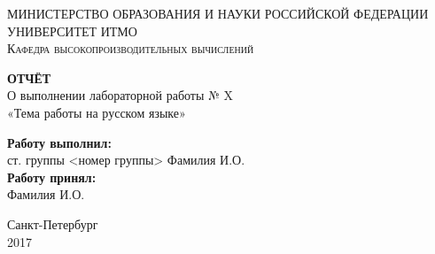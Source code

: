 \documentclass[12pt]{report}
\begin{document}
\def\contentsname{Содержание}

\begin{titlepage}

\begin{center}
\textsc{МИНИСТЕРСТВО ОБРАЗОВАНИЯ И НАУКИ РОССИЙСКОЙ ФЕДЕРАЦИИ\\
УНИВЕРСИТЕТ ИТМО\\
Кафедра высокопроизводительных вычислений
}

\vspace{6.68cm}

\textbf{\large ОТЧЁТ}\\[4.5mm]
О выполнении лабораторной работы № X\\
«Тема работы на русском языке»\\[18mm]
\end{center}
\hspace{\fill}
\begin{minipage}{.48\textwidth}
\textbf{Работу выполнил:}\\
ст. группы <номер группы> Фамилия И.О.\\
\textbf{Работу принял:}\\
\hspace*{3.25cm} Фамилия И.О.\\
\end{minipage}
\vfill
\begin{center}
Санкт-Петербург\\
2017
\end{center}
\end{titlepage}

\restoregeometry


\setcounter{page}{2}


\end{document}
